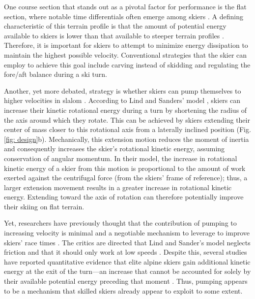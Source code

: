 \documentclass{article}
\begin{document}
One course section that stands out as a pivotal factor for performance is the flat section\cite{supej_new_2011, supej_relations_2006}, where notable time differentials often emerge among skiers \cite{supej_impact_2015}. A defining characteristic of this terrain profile is that the amount of potential energy available to skiers is lower than that available to steeper terrain profiles \cite{supej_differential_2008}. Therefore, it is important for skiers to attempt to minimize energy dissipation to maintain the highest possible velocity. Conventional strategies that the skier can employ to achieve this goal include carving instead of skidding and regulating the fore/aft balance during a ski turn\cite{reid_turn_2009, reid_kinematic_2010,supej_impact_2015, supej_differential_2008}.

Another, yet more debated, strategy is whether skiers can pump themselves to higher velocities in slalom \cite{lind_physics_2013, luginbuhl_identification_2023, mote_accelerations_1983}. According to Lind and Sanders' model \cite{lind_physics_2013}, skiers can increase their kinetic rotational energy during a turn by shortening the radius of the axis around which they rotate. This can be achieved by skiers extending their center of mass closer to this rotational axis from a laterally inclined position (Fig. \ref{fig: design}b). Mechanically, this extension motion reduces the moment of inertia and consequently increases the skier's rotational kinetic energy, assuming conservation of angular momentum. In their model, the increase in rotational kinetic energy of a skier from this motion is proportional to the amount of work exerted against the centrifugal force (from the skiers' frame of reference); thus, a larger extension movement results in a greater increase in rotational kinetic energy. Extending toward the axis of rotation can therefore potentially improve their skiing on flat terrain.

Yet, researchers have previously thought that the contribution of pumping to increasing velocity is minimal and a negotiable mechanism to leverage to improve skiers' race times \cite{supej_differential_2008, supej_doba_2001}. The critics are directed that Lind and Sander's model neglects friction and that it should only work at low speeds \cite{supej_differential_2008, supej_how_2010}. Despite this, several studies have reported quantitative evidence that elite alpine skiers gain additional kinetic energy at the exit of the turn—an increase that cannot be accounted for solely by their available potential energy preceding that moment \cite{reid_kinematic_2010, supej_differential_2008, supej_how_2010, supej_impact_2015}. Thus, pumping appears to be a mechanism that skilled skiers already appear to exploit to some extent. 
\end{document}
